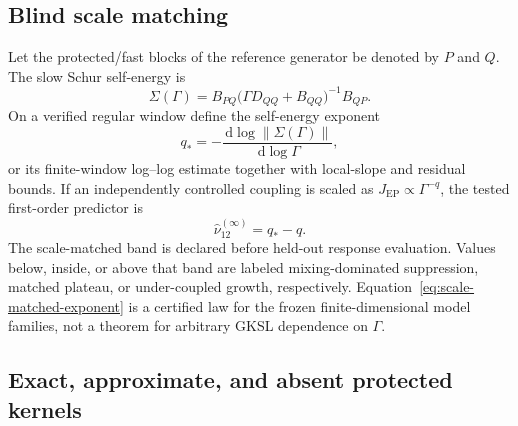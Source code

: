 \documentclass[11pt]{article}
\theoremstyle{definition}
\theoremstyle{remark}
\newcommand{\dd}{\,\mathrm d}
\begin{document}
\subsection{Blind scale matching}

Let the protected/fast blocks of the reference generator be denoted by $P$ and $Q$.  The slow Schur self-energy is
\begin{equation}
 \Sigma(\Gamma)
 =B_{PQ}\bigl(\Gamma D_{QQ}+B_{QQ}\bigr)^{-1}B_{QP}.
 \label{eq:self-energy}
\end{equation}
On a verified regular window define the self-energy exponent
\begin{equation}
 q_*
 =-\frac{\dd\log\|\Sigma(\Gamma)\|}{\dd\log\Gamma},
 \label{eq:q-star}
\end{equation}
or its finite-window log--log estimate together with local-slope and residual bounds.  If an independently controlled coupling is scaled as $J_{\mathrm{EP}}\propto\Gamma^{-q}$, the tested first-order predictor is
\begin{equation}
 \widehat\nu_{12}^{(\infty)}=q_*-q.
 \label{eq:scale-matched-exponent}
\end{equation}
The scale-matched band is declared before held-out response evaluation.  Values below, inside, or above that band are labeled mixing-dominated suppression, matched plateau, or under-coupled growth, respectively.  Equation~\eqref{eq:scale-matched-exponent} is a certified law for the frozen finite-dimensional model families, not a theorem for arbitrary GKSL dependence on $\Gamma$.

\subsection{Exact, approximate, and absent protected kernels}
\end{document}
